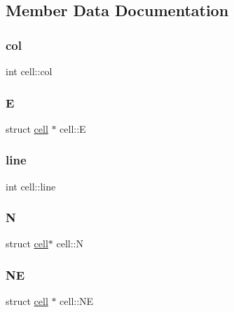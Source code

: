 \subsection{Member Data Documentation}
\mbox{\label{structcell_a4418c02be1f04d63892a69d6fc6c1a94}} 
\subsubsection{\texorpdfstring{col}{col}}
{\footnotesize\ttfamily int cell\+::col}

\mbox{\label{structcell_a5be3a60b5b62fa56fa3bb8505bdade62}} 
\subsubsection{\texorpdfstring{E}{E}}
{\footnotesize\ttfamily struct \mbox{\hyperlink{structcell}{cell}} $\ast$ cell\+::E}

\mbox{\label{structcell_a9f692c876abfe7b2bbd17dc26d9beecf}} 
\subsubsection{\texorpdfstring{line}{line}}
{\footnotesize\ttfamily int cell\+::line}

\mbox{\label{structcell_a938ac45ae9a0c85b73461eba9d0d225d}} 
\subsubsection{\texorpdfstring{N}{N}}
{\footnotesize\ttfamily struct \mbox{\hyperlink{structcell}{cell}}$\ast$ cell\+::N}

\mbox{\label{structcell_a0b5d80e2f1610b81336e96ad0139e4f1}} 
\subsubsection{\texorpdfstring{NE}{NE}}
{\footnotesize\ttfamily struct \mbox{\hyperlink{structcell}{cell}} $\ast$ cell\+::\+NE}

